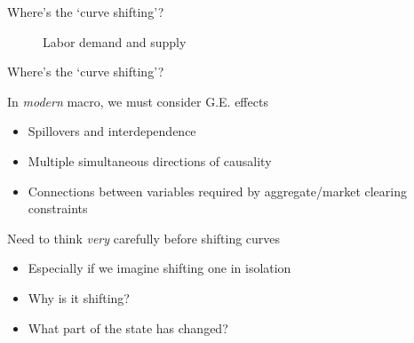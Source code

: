 

\begin{frame}{Where's the `curve shifting'?}

\begin{figure}[!htb]
\caption[Labor demand and supply]{\label{fig:lab_mkt_ns_f_c} Labor demand and supply}
\end{figure}

\end{frame}



\begin{frame}{Where's the `curve shifting'?}

In \textit{modern} macro, we must consider G.E. effects
	\begin{itemize}
	\item	Spillovers and interdependence
	\item	Multiple simultaneous directions of causality
	\item	Connections between variables required by aggregate/market clearing constraints
	\end{itemize}

\vspace{3mm}
Need to think \textit{very} carefully before shifting curves
	\begin{itemize}
	\item	Especially if we imagine shifting one in isolation
	\item	Why is it shifting?
	\item	What part of the state has changed?
	\end{itemize}

\end{frame}

